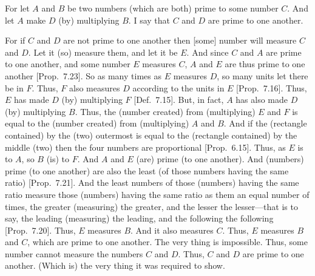 \begin{Parallel}{}{}
{\epsfysize=2in
\centerline{}

For let $A$ and $B$ be two numbers (which are both) prime to some number $C$. And let $A$ make
$D$ (by) multiplying $B$. I say that $C$ and $D$ are prime to one another.

For if $C$ and $D$ are not prime to one another then [some] number will
measure $C$ and $D$. Let it (so) measure them, and let it be $E$. And since
$C$ and $A$ are prime to one another, and some number $E$ measures $C$, $A$ and $E$
are thus prime to one another  [Prop.~7.23].
So as many times as $E$ measures $D$, so many units let there be in $F$.
Thus, $F$ also measures $D$ according to the units in $E$ [Prop.~7.16]. Thus, $E$ has made $D$ (by) multiplying
$F$ [Def.~7.15]. But, in fact, $A$ has also made
$D$ (by) multiplying $B$.
 Thus, the (number created) from (multiplying) $E$ and $F$ is equal to the  (number created) from (multiplying) $A$ and $B$. And if the (rectangle contained) by the (two)
outermost is equal to the (rectangle contained) by the middle (two) then the
four numbers are proportional [Prop.~6.15].
Thus, as $E$ is to $A$, so $B$  (is) to $F$. And $A$ and $E$ (are) prime (to one another).
And (numbers) prime (to one another) are also the least (of those numbers having the same ratio)
[Prop.~7.21]. And the least numbers of those
(numbers) having the same ratio  measure those (numbers)
having the same ratio as them an equal number of times,
the greater (measuring) the greater, and the lesser the lesser---that is
to say, the leading (measuring) the leading, and the following the
following [Prop.~7.20]. Thus, $E$
measures $B$.  And it also measures $C$. Thus, $E$ measures $B$ and $C$, which
are prime to one another. The very thing is impossible. Thus, some
number cannot measure the numbers $C$ and $D$. Thus, $C$ and
$D$ are prime to one another. (Which is) the very thing it was required
to show.}
\end{Parallel}

